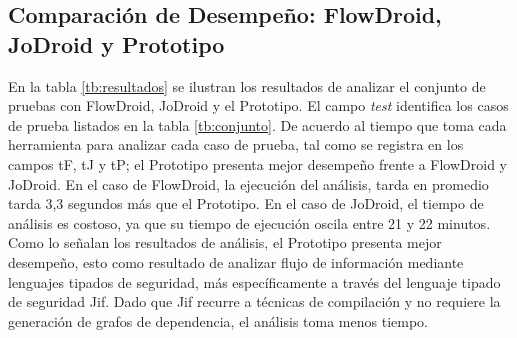 \subsection{Comparación de Desempeño: FlowDroid, JoDroid y Prototipo}
En la tabla \ref{tb:resultados} se ilustran los resultados de analizar el
conjunto de pruebas con FlowDroid, JoDroid y el Prototipo. El campo \emph{test}
identifica los casos de prueba listados en la tabla \ref{tb:conjunto}.
De acuerdo al tiempo que toma cada herramienta para analizar cada caso de
prueba, tal como se registra en los campos tF, tJ y tP; el Prototipo presenta
mejor desempeño frente a FlowDroid y JoDroid. En el caso de FlowDroid, la
ejecución del análisis, tarda en promedio tarda 3,3 segundos más que el
Prototipo. En el caso de JoDroid, el tiempo de análisis es costoso, ya que su tiempo de
ejecución oscila entre 21 y 22 minutos.\newline
Como lo señalan los resultados de análisis, el Prototipo presenta mejor
desempeño, esto como resultado de analizar flujo de información mediante
lenguajes tipados de seguridad, más específicamente a través del lenguaje tipado
de seguridad Jif.
Dado que Jif recurre a técnicas de compilación y no requiere la generación de
grafos de dependencia, el análisis toma menos tiempo.
